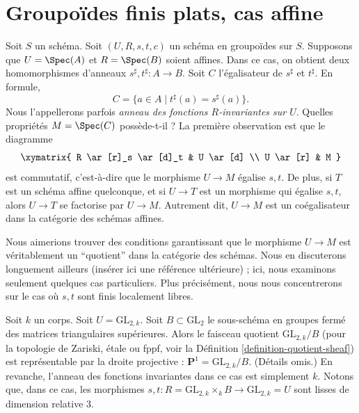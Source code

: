 \section{Groupoïdes finis plats, cas affine}
\label{section-finite-flat}

\noindent
Soit $S$ un schéma.
Soit $(U, R, s, t, c)$ un schéma en groupoïdes sur $S$.
Supposons que $U = \Spec(A)$ et $R = \Spec(B)$ soient affines.
Dans ce cas, on obtient deux homomorphismes d'anneaux
$s^\sharp, t^\sharp : A \longrightarrow B$.
Soit $C$ l'égalisateur de $s^\sharp$ et $t^\sharp$. En formule,
\begin{equation}
\label{equation-invariants}
C = \{a \in A \mid t^\sharp(a) = s^\sharp(a) \}.
\end{equation}
Nous l'appellerons parfois {\it anneau des fonctions $R$-invariantes sur $U$}.
Quelles propriétés $M = \Spec(C)$ possède-t-il ? La première observation est
que le diagramme
$$
\xymatrix{
R \ar[r]_s \ar[d]_t & U \ar[d] \\
U \ar[r] & M
}
$$
est commutatif, c'est-à-dire que le morphisme $U \to M$ égalise $s, t$.
De plus, si $T$ est un schéma affine quelconque, et si $U \to T$ est
un morphisme qui égalise $s, t$, alors $U \to T$ se factorise par $U \to M$.
Autrement dit, $U \to M$ est un coégalisateur dans la catégorie des schémas affines.

\medskip\noindent
Nous aimerions trouver des conditions garantissant que le morphisme $U \to M$ est
véritablement un ``quotient'' dans la catégorie des schémas. Nous en discuterons
longuement ailleurs (insérer ici une référence ultérieure) ; ici, nous examinons seulement
quelques cas particuliers. Plus précisément, nous nous concentrerons sur le cas où $s, t$ sont
finis localement libres.

\begin{example}
\label{example-quotient-projective-line}
Soit $k$ un corps. Soit $U = \text{GL}_{2, k}$. Soit $B \subset \text{GL}_2$
le sous-schéma en groupes fermé des matrices triangulaires supérieures.
Alors le faisceau quotient $\text{GL}_{2, k}/B$ (pour la topologie de Zariski, \'etale ou
fppf, voir la Définition \ref{definition-quotient-sheaf}) est
représentable par la droite projective : $\mathbf{P}^1 = \text{GL}_{2, k}/B$.
(Détails omis.)
En revanche, l'anneau des fonctions invariantes dans ce cas est simplement $k$.
Notons que, dans ce cas, les morphismes
$s, t : R = \text{GL}_{2, k} \times_k B \to \text{GL}_{2, k} = U$ sont lisses
de dimension relative $3$.
\end{example}


